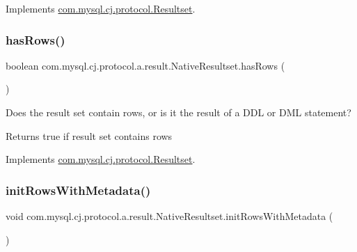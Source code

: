 Implements \mbox{\hyperlink{interfacecom_1_1mysql_1_1cj_1_1protocol_1_1_resultset_ab9b9750b3d8a9d8cc35af6d1e59dd86f}{com.\+mysql.\+cj.\+protocol.\+Resultset}}.

\mbox{\label{classcom_1_1mysql_1_1cj_1_1protocol_1_1a_1_1result_1_1_native_resultset_a6873a98d8b78925b9260230838d280d2}} 
\subsubsection{\texorpdfstring{has\+Rows()}{hasRows()}}
{\footnotesize\ttfamily boolean com.\+mysql.\+cj.\+protocol.\+a.\+result.\+Native\+Resultset.\+has\+Rows (\begin{DoxyParamCaption}{ }\end{DoxyParamCaption})}

Does the result set contain rows, or is it the result of a D\+DL or D\+ML statement?

\begin{DoxyReturn}{Returns}
true if result set contains rows 
\end{DoxyReturn}


Implements \mbox{\hyperlink{interfacecom_1_1mysql_1_1cj_1_1protocol_1_1_resultset_acafe4b216e2086884d0758c64fd34c0b}{com.\+mysql.\+cj.\+protocol.\+Resultset}}.

\mbox{\label{classcom_1_1mysql_1_1cj_1_1protocol_1_1a_1_1result_1_1_native_resultset_a55681e1e25bdf8a26e098f812979bec3}} 
\subsubsection{\texorpdfstring{init\+Rows\+With\+Metadata()}{initRowsWithMetadata()}}
{\footnotesize\ttfamily void com.\+mysql.\+cj.\+protocol.\+a.\+result.\+Native\+Resultset.\+init\+Rows\+With\+Metadata (\begin{DoxyParamCaption}{ }\end{DoxyParamCaption})}

